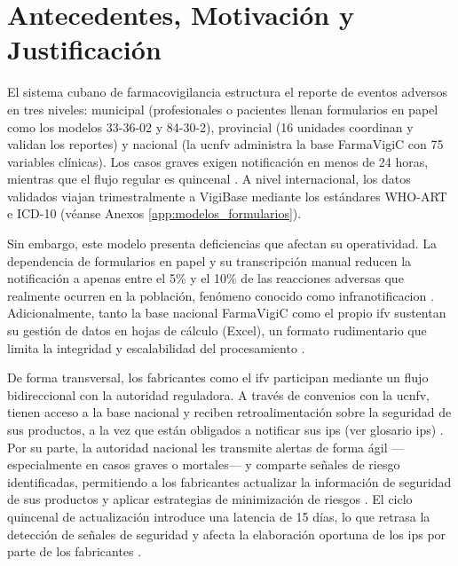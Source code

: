\section{Antecedentes, Motivación y Justificación}\label{section:antecedentesMotivacionJustificacion}

El sistema cubano de farmacovigilancia estructura el reporte de eventos adversos en tres niveles: municipal (profesionales o pacientes llenan formularios en papel como los modelos 33-36-02 y 84-30-2), provincial (16 unidades coordinan y validan los reportes) y nacional (la \gls{ucnfv} administra la base \gls{FarmaVigiC} con 75 variables clínicas). 
Los casos graves exigen notificación en menos de 24 horas, mientras que el flujo regular es quincenal \cite{tarrago_farmacovigilancia_cuba_2019,normas_farmacovigilancia_cuba_2012}. 
A nivel internacional, los datos validados viajan trimestralmente a \gls{VigiBase} mediante los estándares \gls{WHO-ART} e \gls{ICD-10} \cite{normas_farmacovigilancia_cuba_2012} (véanse Anexos \ref{app:modelos_formularios}).

Sin embargo, este modelo presenta deficiencias que afectan su operatividad. 
La dependencia de formularios en papel y su transcripción manual reducen la notificación a apenas entre el 5\% y el 10\% de las reacciones adversas que realmente ocurren en la población, fenómeno conocido como \gls{infranotificacion} \cite{tarrago_farmacovigilancia_cuba_2019}.
Adicionalmente, tanto la base nacional \gls{FarmaVigiC} como el propio \gls{ifv} sustentan su gestión de datos en hojas de cálculo (Excel), un formato rudimentario que limita la integridad y escalabilidad del procesamiento \cite{normas_farmacovigilancia_cuba_2012}.


De forma transversal, los fabricantes como el \gls{ifv} participan mediante un flujo bidireccional con la autoridad reguladora. 
A través de convenios con la \gls{ucnfv}, tienen acceso a la base nacional y reciben retroalimentación sobre la seguridad de sus productos, a la vez que están obligados a notificar sus \gls{ips} (ver glosario \gls{ips}) \cite{normas_farmacovigilancia_cuba_2012}.
Por su parte, la autoridad nacional les transmite alertas de forma ágil —especialmente en casos graves o mortales— y comparte señales de riesgo identificadas, permitiendo a los fabricantes actualizar la información de seguridad de sus productos y aplicar estrategias de minimización de riesgos \cite{normas_farmacovigilancia_cuba_2012}.
El ciclo quincenal de actualización introduce una latencia de 15 días, lo que retrasa la detección de señales de seguridad y afecta la elaboración oportuna de los \gls{ips} por parte de los fabricantes \cite{normas_farmacovigilancia_cuba_2012}.

